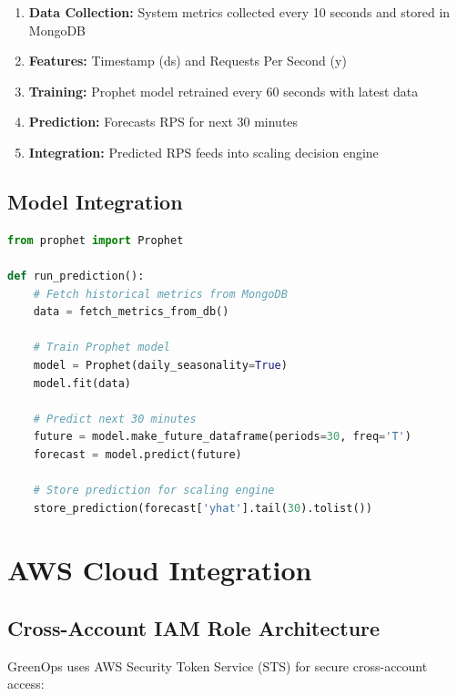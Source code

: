 \documentclass[12pt,a4paper]{report}
\begin{document}
\begin{enumerate}
    \item \textbf{Data Collection:} System metrics collected every 10 seconds and stored in MongoDB
    \item \textbf{Features:} Timestamp (ds) and Requests Per Second (y)
    \item \textbf{Training:} Prophet model retrained every 60 seconds with latest data
    \item \textbf{Prediction:} Forecasts RPS for next 30 minutes
    \item \textbf{Integration:} Predicted RPS feeds into scaling decision engine
\end{enumerate}

\section{Model Integration}

\begin{lstlisting}[language=Python, caption=Prophet Prediction Pipeline]
from prophet import Prophet

def run_prediction():
    # Fetch historical metrics from MongoDB
    data = fetch_metrics_from_db()
    
    # Train Prophet model
    model = Prophet(daily_seasonality=True)
    model.fit(data)
    
    # Predict next 30 minutes
    future = model.make_future_dataframe(periods=30, freq='T')
    forecast = model.predict(future)
    
    # Store prediction for scaling engine
    store_prediction(forecast['yhat'].tail(30).tolist())
\end{lstlisting}

\chapter{AWS Cloud Integration}

\section{Cross-Account IAM Role Architecture}

GreenOps uses AWS Security Token Service (STS) for secure cross-account access:
\end{document}
